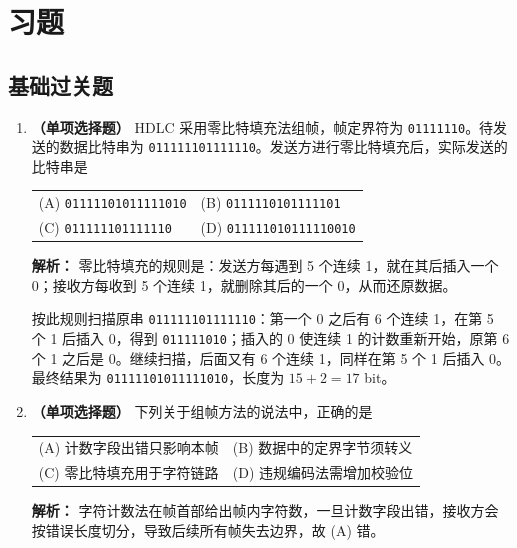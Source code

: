 \section{习题}

\subsection{基础过关题}

\begin{enumerate}

\item \textbf{（单项选择题）} HDLC 采用零比特填充法组帧，帧定界符为 \texttt{01111110}。待发送的数据比特串为 \texttt{011111101111110}。发送方进行零比特填充后，实际发送的比特串是
\begin{center}
\begin{tabular}{ll}
(A) \texttt{01111101011111010} & (B) \texttt{0111110101111101} \\[4pt]
(C) \texttt{011111101111110} & (D) \texttt{011111010111110010}
\end{tabular}
\end{center}

\ifshowsolutions\par\noindent\textbf{解析：} 零比特填充的规则是：发送方每遇到 5 个连续 1，就在其后插入一个 0；接收方每收到 5 个连续 1，就删除其后的一个 0，从而还原数据。

按此规则扫描原串 \texttt{011111101111110}：第一个 0 之后有 6 个连续 1，在第 5 个 1 后插入 0，得到 \texttt{011111010}；插入的 0 使连续 1 的计数重新开始，原第 6 个 1 之后是 0。继续扫描，后面又有 6 个连续 1，同样在第 5 个 1 后插入 0。最终结果为 \texttt{01111101011111010}，长度为 $15+2=17$ bit。\else \answerarea \fi

\item \textbf{（单项选择题）} 下列关于组帧方法的说法中，正确的是
\begin{center}\small
\begin{tabular}{@{}ll@{}}
(A) 计数字段出错只影响本帧 & (B) 数据中的定界字节须转义 \\[4pt]
(C) 零比特填充用于字符链路 & (D) 违规编码法需增加校验位
\end{tabular}
\end{center}

\ifshowsolutions\par\noindent\textbf{解析：} 字符计数法在帧首部给出帧内字符数，一旦计数字段出错，接收方会按错误长度切分，导致后续所有帧失去边界，故 (A) 错。


\end{enumerate}
